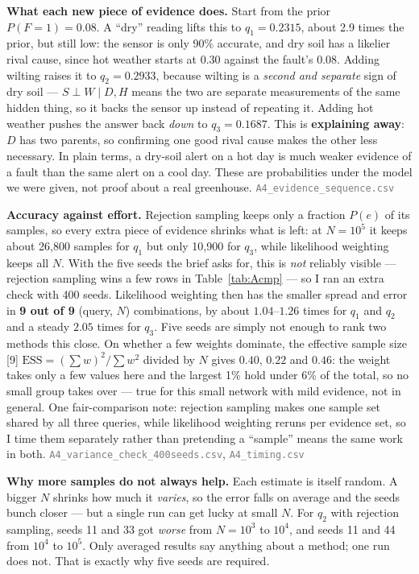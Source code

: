 \documentclass[12pt,a4paper]{article}
\newcommand{\file}[1]{\textcolor{gray}{\small\texttt{#1}}}
\begin{document}
\textbf{What each new piece of evidence does.} Start from the prior $P(F{=}1)=0.08$. A ``dry'' reading
lifts this to $q_1=0.2315$, about 2.9 times the prior, but still low: the sensor is only 90\% accurate,
and dry soil has a likelier rival cause, since hot weather starts at $0.30$ against the fault's $0.08$.
Adding wilting raises it to $q_2=0.2933$, because wilting is a \emph{second and separate} sign of dry
soil --- $S\perp W\mid D,H$ means the two are separate measurements of the same hidden thing, so it
backs the sensor up instead of repeating it. Adding hot weather pushes the answer back \emph{down} to
$q_3=0.1687$. This is \textbf{explaining away}: $D$ has two parents, so confirming one good rival cause
makes the other less necessary. In plain terms, a dry-soil alert on a hot day is much weaker evidence
of a fault than the same alert on a cool day. These are probabilities under the model we were given,
not proof about a real greenhouse. \file{A4\_evidence\_sequence.csv}

\textbf{Accuracy against effort.} Rejection sampling keeps only a fraction $P(e)$ of its samples, so
every extra piece of evidence shrinks what is left: at $N{=}10^5$ it keeps about 26{,}800 samples for
$q_1$ but only 10{,}900 for $q_3$, while likelihood weighting keeps all $N$. With the five seeds the
brief asks for, this is \emph{not} reliably visible --- rejection sampling wins a few rows in
Table~\ref{tab:Acmp} --- so I ran an extra check with 400 seeds. Likelihood weighting then has the
smaller spread and error in \textbf{9 out of 9} (query, $N$) combinations, by about $1.04$--$1.26$ times
for $q_1$ and $q_2$ and a steady $2.05$ times for $q_3$. Five seeds are simply not enough to rank two
methods this close. On whether a few weights dominate, the effective sample size [9]
$\mathrm{ESS}=(\sum w)^2/\sum w^2$ divided by $N$ gives $0.40$, $0.22$ and $0.46$: the weight takes only
a few values here and the largest 1\% hold under 6\% of the total, so no small group takes over --- true
for this small network with mild evidence, not in general. One fair-comparison note: rejection sampling
makes one sample set shared by all three queries, while likelihood weighting reruns per evidence set, so
I time them separately rather than pretending a ``sample'' means the same work in both.
\file{A4\_variance\_check\_400seeds.csv}, \file{A4\_timing.csv}

\textbf{Why more samples do not always help.} Each estimate is itself random. A bigger $N$ shrinks how
much it \emph{varies}, so the error falls on average and the seeds bunch closer --- but a single run can
get lucky at small $N$. For $q_2$ with rejection sampling, seeds 11 and 33 got \emph{worse} from
$N{=}10^3$ to $10^4$, and seeds 11 and 44 from $10^4$ to $10^5$. Only averaged results say anything
about a method; one run does not. That is exactly why five seeds are required.
\end{document}
